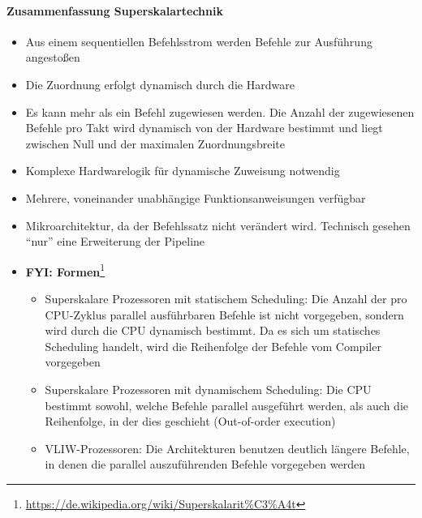 		\paragraph{Zusammenfassung Superskalartechnik}
			\begin{itemize}
				\item Aus einem sequentiellen Befehlsstrom werden Befehle zur Ausführung angestoßen
				\item Die Zuordnung erfolgt dynamisch durch die Hardware
				\item Es kann mehr als ein Befehl zugewiesen werden. Die Anzahl der zugewiesenen Befehle pro Takt wird dynamisch von der Hardware bestimmt und liegt zwischen Null und der maximalen Zuordnungsbreite
				\item Komplexe Hardwarelogik für dynamische Zuweisung notwendig
				\item Mehrere, voneinander unabhängige Funktionsanweisungen verfügbar
				\item Mikroarchitektur, da der Befehlssatz nicht verändert wird. Technisch gesehen "`nur"' eine Erweiterung der Pipeline
				\item \textbf{FYI: Formen}\footnote{\url{https://de.wikipedia.org/wiki/Superskalarit\%C3\%A4t}}
				\begin{itemize}
					\item Superskalare Prozessoren mit statischem Scheduling: Die Anzahl der pro CPU-Zyklus parallel ausführbaren Befehle ist nicht vorgegeben, sondern wird durch die CPU dynamisch bestimmt. Da es sich um statisches Scheduling handelt, wird die Reihenfolge der Befehle vom Compiler vorgegeben
					\item Superskalare Prozessoren mit dynamischem Scheduling: Die CPU bestimmt sowohl, welche Befehle parallel ausgeführt werden, als auch die Reihenfolge, in der dies geschieht (Out-of-order execution)
					\item VLIW-Prozessoren: Die Architekturen benutzen deutlich längere Befehle, in denen die parallel auszuführenden Befehle vorgegeben werden
				\end{itemize}
			\end{itemize}

